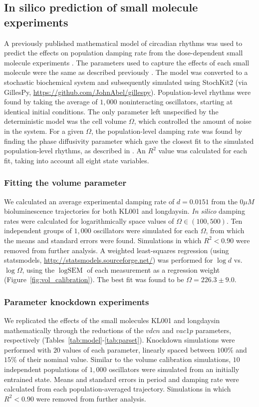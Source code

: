 \documentclass[11pt, letterpaper]{article}
\begin{document}
\subsection*{{In silico} prediction of small molecule experiments}
A previously published mathematical model of circadian rhythms was used to predict the effects on population damping rate from the dose-dependent small molecule experiments \cite{Hirota2012}.
The parameters used to capture the effects of each small molecule were the same as described previously \cite{St.John2014}.
The model was converted to a stochastic biochemical system and subsequently simulated using StochKit2 \cite{Sanft2011a} (via GillesPy, \url{https://github.com/JohnAbel/gillespy}).
Population-level rhythms were found by taking the average of $1,000$ noninteracting oscillators, starting at identical initial conditions.
The only parameter left unspecified by the deterministic model was the cell volume $\Omega$, which controlled the amount of noise in the system.
For a given $\Omega$, the population-level damping rate was found by finding the phase diffusivity parameter which gave the closest fit to the simulated population-level rhythms, as described in \cite{St.John2014a}.
An $R^2$ value was calculated for each fit, taking into account all eight state variables.

\subsubsection*{Fitting the volume parameter}
We calculated an average experimental damping rate of $d = 0.0151$ from the $0 \mu M$ bioluminescence trajectories for both KL001 and longdaysin.
{\itshape In silico} damping rates were calculated for logarithmically space values of $\Omega \in (100, 500)$.
Ten independent groups of $1,000$ oscillators were simulated for each $\Omega$, from which the means and standard errors were found.
Simulations in which $R^2 < 0.90$ were removed from further analysis.
A weighted least-squares regression (using statsmodels, \url{http://statsmodels.sourceforge.net/}) was performed for $\log d$ vs.\ $\log \Omega$, using the $\log \text{SEM}$ of each measurement as a regression weight (Figure~\ref{fig:vol_calibration}).
The best fit was found to be $\Omega = 226.3 \pm 9.0$.

\subsubsection*{Parameter knockdown experiments}
We replicated the effects of the small molecules KL001 and longdaysin mathematically through the reductions of the $vdcn$ and $vac1p$ parameters, respectively (Tables~\ref{tab:model}-\ref{tab:parset}).
Knockdown simulations were performed with $20$ values of each parameter, linearly spaced between $100\%$ and $15\%$ of their nominal value.
Similar to the volume calibration simulations, $10$ independent populations of $1,000$ oscillators were simulated from an initially entrained state.
Means and standard errors in period and damping rate were calculated from each population-averaged trajectory.
Simulations in which $R^2 < 0.90$ were removed from further analysis.
\end{document}
